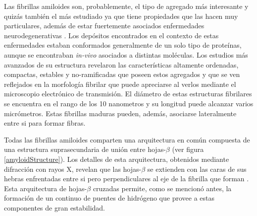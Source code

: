 Las fibrillas amiloides son, probablemente, el tipo de agregado más interesante y quizás también el más estudiado \cite{sipe2000review} ya que tiene propiedades que las hacen muy particulares, además de estar fuertemente asociados 
enfermedades neurodegenerativas \cite{ross2004protein}.
Los depósitos encontrados en el contexto de estas enfermedades estaban conformados generalmente de un solo tipo de proteínas, aunque se encontraban \textit{in-vivo} asociados a distintas moléculas.
Los estudios más avanzados de su estructura revelaron las características altamente ordenadas, compactas, estables y no-ramificadas que poseen estos agregados y que se ven reflejados en
la morfología fibrilar que puede apreciarse al verlos mediante el microscopio electrónico de transmisión.
El diámetro de estas estructuras fibrilares se encuentra en el rango de los 10 nanometros y su longitud puede alcanzar varios micrómetros. 
Estas fibrillas maduras pueden, además, asociarse lateralmente entre si para formar fibras.

Todas las fibrillas amiloides comparten una arquitectura en común compuesta de una estructura suprasecundaria de unión entre hojas-$\beta$ (ver figura \ref{amyloidStructure}).
Los detalles de esta arquitectura, obtenidos mediante difracción con rayos X, revelan que 
las hojas-$\beta$ se extienden con las caras de sus hebras enfrentadas entre si pero perpendiculares al eje de la fibrilla que forman \cite{nelson2005structure}.  
Esta arquitectura de hojas-$\beta$ cruzadas permite, como se mencionó antes, la formación de un continuo de puentes de hidrógeno que provee a estas componentes de gran estabilidad. 

